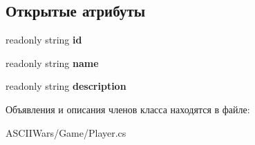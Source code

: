 \subsection*{Открытые атрибуты}
\begin{DoxyCompactItemize}
\item 
\hypertarget{class_a_s_c_i_i_wars_1_1_game_1_1_item_a744d51f7684a4e46a1f834f8666db58e}{}\label{class_a_s_c_i_i_wars_1_1_game_1_1_item_a744d51f7684a4e46a1f834f8666db58e} 
readonly string {\bfseries id}
\item 
\hypertarget{class_a_s_c_i_i_wars_1_1_game_1_1_item_a994b9ec5f10c123e4345da159c090091}{}\label{class_a_s_c_i_i_wars_1_1_game_1_1_item_a994b9ec5f10c123e4345da159c090091} 
readonly string {\bfseries name}
\item 
\hypertarget{class_a_s_c_i_i_wars_1_1_game_1_1_item_a6ff41e953ccebc64a8df8f8c434535a0}{}\label{class_a_s_c_i_i_wars_1_1_game_1_1_item_a6ff41e953ccebc64a8df8f8c434535a0} 
readonly string {\bfseries description}
\end{DoxyCompactItemize}


Объявления и описания членов класса находятся в файле\+:\begin{DoxyCompactItemize}
\item 
A\+S\+C\+I\+I\+Wars/\+Game/Player.\+cs\end{DoxyCompactItemize}

